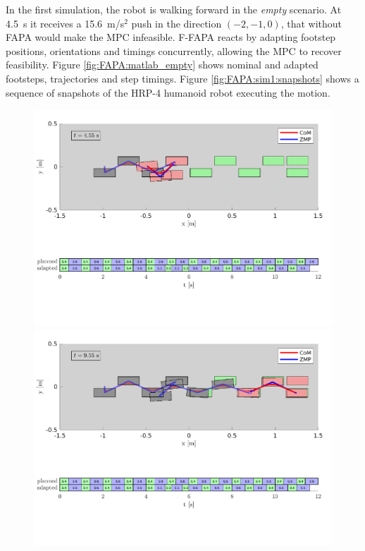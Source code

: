In the first simulation, the robot is walking forward in the {\em empty}
scenario. At 4.5~s it receives a 15.6~m/s$^2$ push in the direction $(-2, -1, 0)$,
that without FAPA would make the MPC infeasible. F-FAPA reacts by adapting
footstep positions, orientations and timings concurrently, allowing the MPC
to recover feasibility. Figure \ref{fig:FAPA:matlab_empty} shows nominal and
adapted footsteps, trajectories and step timings.
Figure \ref{fig:FAPA:sim1:snapshots} shows a sequence of snapshots of the
HRP-4 humanoid robot executing the motion.
\begin{figure}
    \centering
    \includegraphics[trim={0 5.9cm 0 0.7cm},clip,width=\textwidth]{figures/empty-fixed-plot-after-push.pdf}
    \includegraphics[trim={0 5.9cm 0 0.7cm},clip,width=\textwidth]{figures/empty-fixed-plot-completing-task.pdf}

\end{figure}
